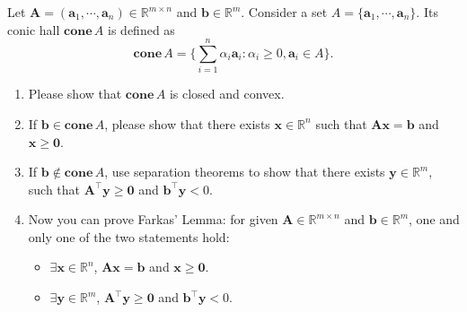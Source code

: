 \documentclass[11pt,letter,notitlepage]{article}
\begin{document}
\newpage
\begin{exercise}
    Let $\mathbf{A}=(\mathbf{a}_1,\cdots,\mathbf{a}_n)\in \mathbb{R}^{m\times n}$ and $\mathbf{b}\in\mathbb{R}^m$. Consider a set $A=\{ \mathbf{a}_1,\cdots ,\mathbf{a}_n\}$. Its conic hall $\textbf{cone}\,A$ is defined as
        $$
        \textbf{cone}\,A=\{ \sum_{i=1}^n\alpha_i\mathbf{a}_i:\alpha_i\ge 0,\mathbf{a}_i\in A\}.
        $$
    \begin{enumerate}
        \item
        Please show that $\textbf{cone}\,A$ is closed and convex.
        \item
        If $\mathbf{b}\in\textbf{cone}\,A$, please show that there exists $\mathbf{x}\in\mathbb{R}^n$ such that $\mathbf{Ax}=\mathbf{b}$ and $\mathbf{x}\ge \mathbf{0}$.
        \item
        If $\mathbf{b}\notin\textbf{cone}\,A$, use separation theorems to show that there exists $\mathbf{y}\in\mathbb{R}^m$, such that $\mathbf{A}^\top \mathbf{y}\ge \mathbf{0}$ and $\mathbf{b}^\top\mathbf{y}<0$.
        \item
        Now you can prove Farkas' Lemma: for given $\mathbf{A}\in\mathbb{R}^{m\times n}$ and $\mathbf{b}\in\mathbb{R}^m$, one and only one of the two statements hold:
        \begin{itemize}
            \item
            $\exists \mathbf{x}\in\mathbb{R}^n$, $\mathbf{Ax}=\mathbf{b}$ and $\mathbf{x}\ge \mathbf{0}$.
            \item
            $\exists \mathbf{y}\in\mathbb{R}^m$, $\mathbf{A}^\top\mathbf{y}\ge\mathbf{0}$ and $\mathbf{b}^\top\mathbf{y}<0$.
        \end{itemize}
    \end{enumerate}
\end{exercise}
\begin{solution}

\end{solution}






	
	\newpage
     
     
	
\end{document}
